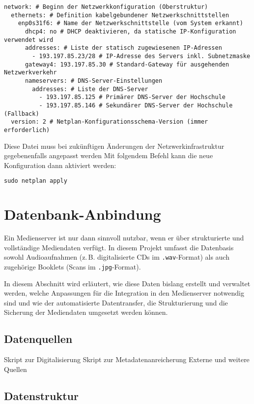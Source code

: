 \documentclass[12pt,a4paper]{report}
\begin{document}
\begin{verbatim}
network: # Beginn der Netzwerkkonfiguration (Oberstruktur)
  ethernets: # Definition kabelgebundener Netzwerkschnittstellen
    enp0s31f6: # Name der Netzwerkschnittstelle (vom System erkannt)
      dhcp4: no # DHCP deaktivieren, da statische IP-Konfiguration verwendet wird
      addresses: # Liste der statisch zugewiesenen IP-Adressen
        - 193.197.85.23/28 # IP-Adresse des Servers inkl. Subnetzmaske
      gateway4: 193.197.85.30 # Standard-Gateway für ausgehenden Netzwerkverkehr
      nameservers: # DNS-Server-Einstellungen
        addresses: # Liste der DNS-Server
          - 193.197.85.125 # Primärer DNS-Server der Hochschule
          - 193.197.85.146 # Sekundärer DNS-Server der Hochschule (Fallback)
  version: 2 # Netplan-Konfigurationsschema-Version (immer erforderlich)
\end{verbatim}

Diese Datei muss bei zukünftigen Änderungen der Netzwerkinfrastruktur gegebenenfalls angepasst werden
Mit folgendem Befehl kann die neue Konfiguration dann aktiviert werden:

\begin{verbatim}
sudo netplan apply
\end{verbatim}

\section{Datenbank-Anbindung}
Ein Medienserver ist nur dann sinnvoll nutzbar, wenn er über strukturierte und vollständige Mediendaten verfügt. 
In diesem Projekt umfasst die Datenbasis sowohl Audioaufnahmen (z.\,B. digitalisierte CDs im \texttt{.wav}-Format) 
als auch zugehörige Booklets (Scans im \texttt{.jpg}-Format).  

In diesem Abschnitt wird erläutert, wie diese Daten bislang erstellt und verwaltet werden, 
welche Anpassungen für die Integration in den Medienserver notwendig sind und 
wie der automatisierte Datentransfer, die Strukturierung und die Sicherung der Mediendaten umgesetzt werden können.  
 
    \subsection{Datenquellen}
    Skript zur Digitalisierung
    Skript zur Metadatenanreicherung
    Externe und weitere Quellen

    \subsection{Datenstruktur}
\end{document}
